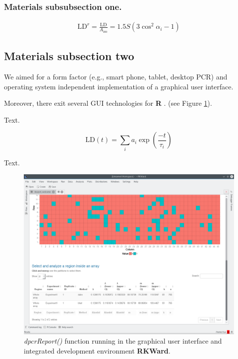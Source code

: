 \documentclass[a4,center,fleqn]{NAR}
\begin{document}
\subsubsection{Materials subsubsection one.}

\begin{align}
\mathrm{LD}^r = \frac{\mathrm{LD}}{A_\mathrm{iso}}
= 1.5 S \left( 3 \cos^2 \alpha_i - 1 \right)
\end{align}



\subsection{Materials subsection two}

We aimed for a form factor (e.g., smart phone, tablet, desktop PCR) and 
operating system independent implementation of a graphical user interface. 

Moreover, there exit several GUI technologies for \textbf{R} \cite{rodiger_rkward_2012}.
(see Figure \ref{GUI_RKWard_1}).

Text.

\begin{equation*}
\mathrm{LD} \left( t \right) =
\sum\limits_i
a_i \exp \left( \frac{-t}{\tau_i} \right)
\end{equation*}

Text.

\begin{figure}[t]
\begin{center}
\includegraphics[width=17cm]{GUI_RKWard_1.png}
\end{center}
\caption{\textit{dpcrReport()} function running in the graphical user interface and integrated development environment \textbf{RKWard}.}
\label{GUI_RKWard_1}
\end{figure}
\end{document}
